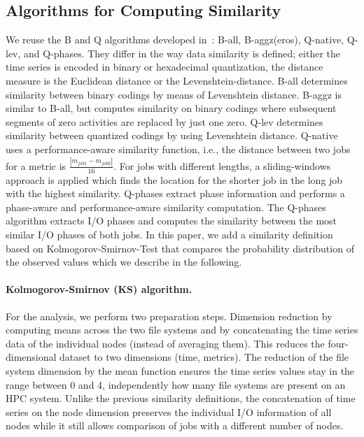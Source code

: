 \documentclass{jhps}
\begin{document}
\subsection{Algorithms for Computing Similarity}
We reuse the B and Q algorithms developed in~\cite{Eugen20HPS}: B-all, B-aggz(eros), Q-native, Q-lev, and Q-phases.
They differ in the way data similarity is defined; either the time series is encoded in binary or hexadecimal quantization, the distance measure is the Euclidean distance or the Levenshtein-distance.
B-all determines similarity between binary codings by means of Levenshtein distance.
B-aggz is similar to B-all, but computes similarity on binary codings where subsequent segments of zero activities are replaced by just one zero.
Q-lev determines similarity between quantized codings by using Levenshtein distance.
Q-native uses a performance-aware similarity function, i.e., the distance between two jobs for a metric is $\frac{|m_{job1} - m_{job2}|}{16}$.
For jobs with different lengths, a sliding-windows approach is applied which finds the location for the shorter job in the long job with the highest similarity.
Q-phases extract phase information and performs a phase-aware and performance-aware similarity computation.
The Q-phases algorithm extracts I/O phases and computes the similarity between the most similar I/O phases of both jobs.
In this paper, we add a similarity definition based on Kolmogorov-Smirnov-Test that compares the probability distribution of the observed values which we describe in the following.

\paragraph{Kolmogorov-Smirnov (KS) algorithm.}
For the analysis, we perform two preparation steps.
Dimension reduction by computing means across the two file systems and by concatenating the time series data of the individual nodes (instead of averaging them).
This reduces the four-dimensional dataset to two dimensions (time, metrics).
The reduction of the file system dimension by the mean function ensures the time series values stay in the range between 0 and 4, independently how many file systems are present on an HPC system.
Unlike the previous similarity definitions, the concatenation of time series on the node dimension preserves the individual I/O information of all nodes while it still allows comparison of jobs with a different number of nodes.
\end{document}
